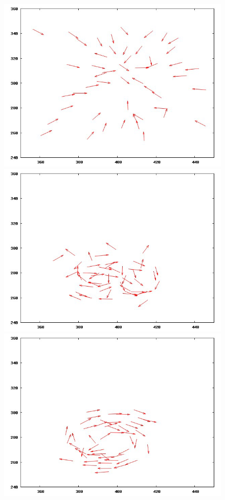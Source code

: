 \begin{figure}[!ht]
\centering
    \includegraphics[scale=0.3]{fig/cap02/atraccionRepulsion/11.png}
    \includegraphics[scale=0.3]{fig/cap02/atraccionRepulsion/12.png}
    \includegraphics[scale=0.3]{fig/cap02/atraccionRepulsion/13.png}

\end{figure}
